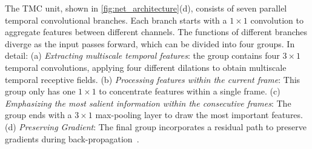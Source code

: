 \documentclass[journal,comsoc]{IEEEtran}
\begin{document}
The TMC unit, shown in \autoref{fig:net_architecture}(d), consists of seven parallel temporal convolutional branches. 
Each branch starts with a $1 \times 1$ convolution to aggregate features between different channels. 
The functions of different branches diverge as the input passes forward, which can be divided into four groups. 
In detail: (a) \textit{Extracting multiscale temporal features}: the group contains four $3 \times 1$ temporal convolutions, applying four different dilations to obtain multiscale temporal receptive fields. (b) \textit{Processing features within the current frame}: This group only has one $1 \times 1$ to concentrate features within a single frame. (c) \textit{Emphasizing the most salient information within the consecutive frames}: The group ends with a $3 \times 1$ max-pooling layer to draw the most important features. (d) \textit{Preserving Gradient}: The final group incorporates a residual path to preserve gradients during back-propagation~\cite{chen2017dual}. 
\end{document}
